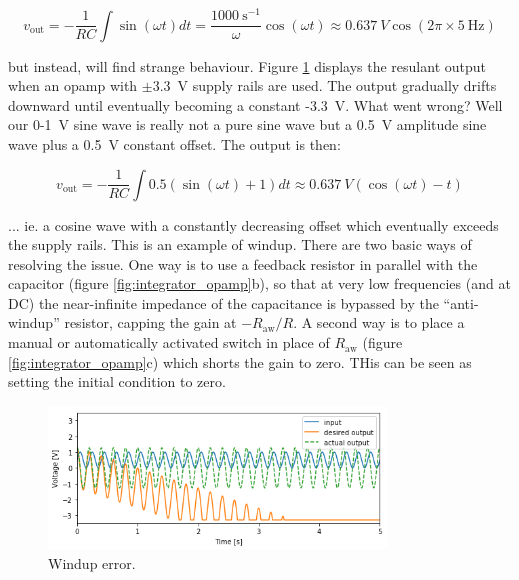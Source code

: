 \documentclass[]{article}
\begin{document}
$$
v_\text{out} = -\frac{1}{RC}\int\sin(\omega t)dt = \frac{1000~\text{s}^{-1}}{\omega}\cos(\omega t) \approx 0.637~V\cos(2\pi\times5~\text{Hz})
$$

\noindent but instead, will find strange behaviour. Figure \ref{fig:windup_error} displays the resulant output when an opamp with $\pm3.3$~V supply rails are used. The output gradually drifts downward until eventually becoming a constant -3.3~V. What went wrong? Well our 0-1~V sine wave is really not a pure sine wave but a 0.5~V amplitude sine wave plus a 0.5~V constant offset. The output is then:

$$
v_\text{out} = -\frac{1}{RC}\int0.5\left(\sin(\omega t) + 1\right)dt \approx 0.637~V\left(\cos(\omega t) - t\right)
$$

\noindent ... ie. a cosine wave with a constantly decreasing offset which eventually exceeds the supply rails. This is an example of windup. There are two basic ways of resolving the issue. One way is to use a feedback resistor in parallel with the capacitor (figure \ref{fig:integrator_opamp}b), so that at very low frequencies (and at DC) the near-infinite impedance of the capacitance is bypassed by the ``anti-windup'' resistor, capping the gain at $-R_\text{aw}/R$. A second way is to place a manual or automatically activated switch in place of $R_\text{aw}$ (figure \ref{fig:integrator_opamp}c) which shorts the gain to zero. THis can be seen as setting the initial condition to zero.
\begin{figure}[ht]
\caption{Windup error.}
\label{fig:windup_error}
	\begin{center}
		\includegraphics[width = 0.8\textwidth]{Images/windup_error.png}
	\end{center}
\end{figure}
\end{document}
